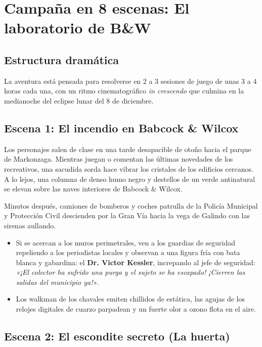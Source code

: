 \chapter{Campaña en 8 escenas: El laboratorio de B\&W}

\section{Estructura dramática}

La aventura está pensada para resolverse en 2 a 3 sesiones de juego de unas 3 a 4 horas cada una, con un ritmo cinematográfico \emph{in crescendo} que culmina en la medianoche del eclipse lunar del 8 de diciembre.

\section{Escena 1: El incendio en Babcock \& Wilcox}


Los personajes salen de clase en una tarde desapacible de otoño hacia el parque de Markonzaga. Mientras juegan o comentan las últimas novedades de los recreativos, una sacudida sorda hace vibrar los cristales de los edificios cercanos. A lo lejos, una columna de denso humo negro y destellos de un verde antinatural se elevan sobre las naves interiores de Babcock \& Wilcox.

Minutos después, camiones de bomberos y coches patrulla de la Policía Municipal y Protección Civil descienden por la Gran Vía hacia la vega de Galindo con las sirenas aullando.
\begin{itemize}
  \item {} Si se acercan a los muros perimetrales, ven a los guardias de seguridad repeliendo a los periodistas locales y observan a una figura fría con bata blanca y gabardina: el \textbf{Dr. Victor Kessler}, increpando al jefe de seguridad: \emph{«¡El colector ha sufrido una purga y el sujeto se ha escapado! ¡Cierren las salidas del municipio ya!»}.
  \item {} Los walkman de los chavales emiten chillidos de estática, las agujas de los relojes digitales de cuarzo parpadean y un fuerte olor a ozono flota en el aire.
\end{itemize}

\section{Escena 2: El escondite secreto (La huerta)}


